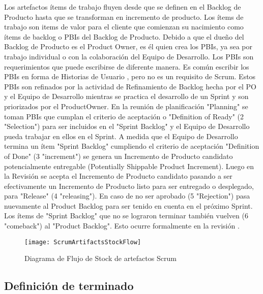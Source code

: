 Los artefactos ítems de trabajo fluyen desde que se definen en el Backlog de Producto hasta que se transforman en incremento de producto. Los ítems de trabajo son items de valor para el cliente que comienzan su nacimiento como ítems de backlog o PBIs del Backlog de Producto. Debido a que el dueño del Backlog de Producto es el Product Owner, es él quien crea los PBIs, ya sea por trabajo individual o con la colaboración del Equipo de Desarrollo. Los PBIs son requerimientos que puede escribirse de diferente manera. Es común escribir los PBIs en forma de Historias de Usuario \cite{Cohn-2004}, pero no es un requisito de Scrum. Estos PBIs son refinados por la actividad de Refinamiento de Backlog hecha por el PO y el Equipo de Desarrollo mientras se practica el desarrollo de un Sprint y son priorizados por el ProductOwner. En la reunión de planificación "Planning" se toman PBIs que cumplan el criterio de aceptación o "Definition of Ready" (2 "Selection") para ser incluidos en el "Sprint Backlog" y el Equipo de Desarrollo pueda trabajar en ellos en el Sprint. A medida que el Equipo de Desarrollo termina un ítem "Sprint Backlog" cumpliendo el criterio de aceptación "Definition of Done" (3 "increment") se genera un Incremento de Producto candidato potencialmente entregable (Potentially Shippable Product Increment). Luego en la Revisión se acepta el Incremento de Producto candidato pasando a ser efectivamente un Incremento de Producto listo para ser entregado o desplegado, para "Release" (4 "releasing"). En caso de no ser aprobado (5 "Rejection") pasa nuevamente al Product Backlog para ser tenido en cuenta en el próximo Sprint. Los ítems de "Sprint Backlog" que no se lograron terminar también vuelven (6 "comeback") al "Product Backlog". Esto ocurre formalmente en la revisión \cite{Martin-Alaimo-2014}.

\begin{figure}[h]
  \centering
  \texttt{[image: ScrumArtifactsStockFlow]}
  \caption{Diagrama de Flujo de Stock de artefactos Scrum}
  \centering
  \label{fig:ScrumArtifactsStockFlow} 
\end{figure}
\FloatBarrier

\subsection{Definición de terminado}

